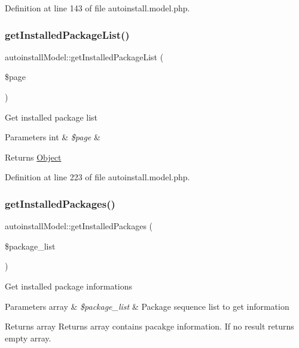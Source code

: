 Definition at line 143 of file autoinstall.\+model.\+php.

\mbox{\label{classautoinstallModel_a2f132c9c41e1689b3e28df6097dae238}} 
\subsubsection{\texorpdfstring{get\+Installed\+Package\+List()}{getInstalledPackageList()}}
{\footnotesize\ttfamily autoinstall\+Model\+::get\+Installed\+Package\+List (\begin{DoxyParamCaption}\item[{}]{\$page }\end{DoxyParamCaption})}

Get installed package list


\begin{DoxyParams}[1]{Parameters}
int & {\em \$page} & \\
\hline
\end{DoxyParams}
\begin{DoxyReturn}{Returns}
\hyperlink{classObject}{Object} 
\end{DoxyReturn}


Definition at line 223 of file autoinstall.\+model.\+php.

\mbox{\label{classautoinstallModel_a91d9fe9fc6776b5338fca658b5b1a6d8}} 
\subsubsection{\texorpdfstring{get\+Installed\+Packages()}{getInstalledPackages()}}
{\footnotesize\ttfamily autoinstall\+Model\+::get\+Installed\+Packages (\begin{DoxyParamCaption}\item[{}]{\$package\+\_\+list }\end{DoxyParamCaption})}

Get installed package informations


\begin{DoxyParams}[1]{Parameters}
array & {\em \$package\+\_\+list} & Package sequence list to get information \\
\hline
\end{DoxyParams}
\begin{DoxyReturn}{Returns}
array Returns array contains pacakge information. If no result returns empty array. 
\end{DoxyReturn}


